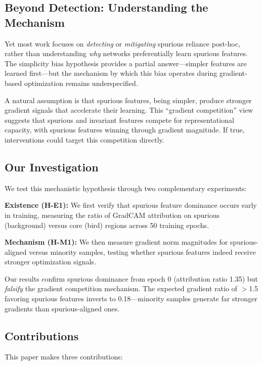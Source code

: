 \subsection{Beyond Detection: Understanding the Mechanism}

Yet most work focuses on \emph{detecting} or \emph{mitigating} spurious reliance post-hoc, rather than understanding \emph{why} networks preferentially learn spurious features. The simplicity bias hypothesis \citep{shah2020pitfalls} provides a partial answer---simpler features are learned first---but the mechanism by which this bias operates during gradient-based optimization remains underspecified.

A natural assumption is that spurious features, being simpler, produce stronger gradient signals that accelerate their learning. This ``gradient competition'' view suggests that spurious and invariant features compete for representational capacity, with spurious features winning through gradient magnitude. If true, interventions could target this competition directly.

\subsection{Our Investigation}

We test this mechanistic hypothesis through two complementary experiments:

\textbf{Existence (H-E1):} We first verify that spurious feature dominance occurs early in training, measuring the ratio of GradCAM attribution on spurious (background) versus core (bird) regions across 50 training epochs.

\textbf{Mechanism (H-M1):} We then measure gradient norm magnitudes for spurious-aligned versus minority samples, testing whether spurious features indeed receive stronger optimization signals.

Our results confirm spurious dominance from epoch 0 (attribution ratio 1.35) but \emph{falsify} the gradient competition mechanism. The expected gradient ratio of $>$1.5 favoring spurious features inverts to 0.18---minority samples generate far stronger gradients than spurious-aligned ones.

\subsection{Contributions}

This paper makes three contributions:

